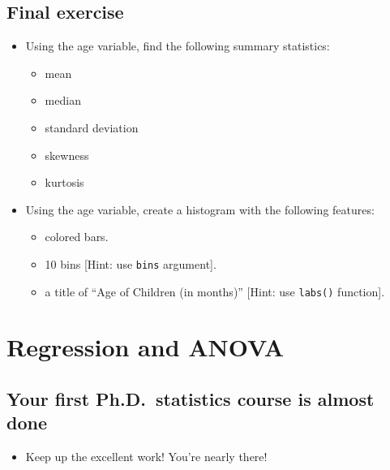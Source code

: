 \documentclass[
]{book}
\providecommand{\tightlist}{%
  \setlength{\itemsep}{0pt}\setlength{\parskip}{0pt}}
\begin{document}
\section{Final exercise}\label{final-exercise-2}

\begin{itemize}
\item
  Using the age variable, find the following summary statistics:

  \begin{itemize}
  \tightlist
  \item
    mean
  \item
    median
  \item
    standard deviation
  \item
    skewness
  \item
    kurtosis
  \end{itemize}
\item
  Using the age variable, create a histogram with the following features:

  \begin{itemize}
  \tightlist
  \item
    colored bars.
  \item
    10 bins {[}Hint: use \texttt{bins} argument{]}.
  \item
    a title of ``Age of Children (in months)'' {[}Hint: use \texttt{labs()} function{]}.
  \end{itemize}
\end{itemize}

\chapter{Regression and ANOVA}\label{regression-and-anova}

\section{Your first Ph.D.~statistics course is almost done}\label{your-first-ph.d.-statistics-course-is-almost-done}

\begin{itemize}
\tightlist
\item
  Keep up the excellent work! You're nearly there!
\end{itemize}
\end{document}
